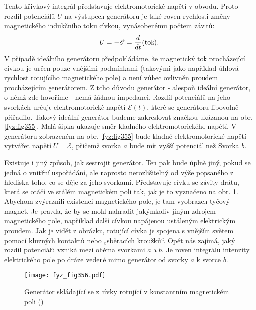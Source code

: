   Tento křivkový integrál představuje elektromotorické napětí v obvodu. Proto rozdíl potenciálů 
  \(U\) na výstupech generátoru je také roven rychlosti změny magnetického indukčního toku cívkou, 
  vynásobenému počtem závitů:
  \begin{equation}\label{fyz:eq479}
   U = -\mathscr{E} = \dfrac{d  }{d t}(\text{tok}).
  \end{equation}
  V případě ideálního generátoru předpokládáme, že magnetický tok procházející cívkou je určen 
  pouze vnějšími podmínkami (takovými jako například úhlová rychlost rotujícího magnetického pole) 
  a není vůbec ovlivněn proudem procházejícím generátorem. Z toho důvodu generátor - alespoň 
  ideální generátor, o němž zde hovoříme - nemá žádnou impedanci. Rozdíl potenciálů na jeho 
  svorkách určuje elektromotorické napětí \(\mathscr{E}(t)\), které se generátoru libovolně 
  přiřadilo. Takový ideální generátor budeme zakreslovat značkou ukázanou na obr. \ref{fyz:fig355}. 
  Malá šipka ukazuje směr kladného elektromotorického napětí. V generátoru zobrazeném na obr. 
  \ref{fyz:fig355} bude kladné elektromotorické napětí vytvářet napětí \(U=\mathscr{E}\), přičemž 
  svorka \(a\) bude mít vyšší potenciál než Svorka \(b\).
  
  Existuje i jiný způsob, jak sestrojit generátor. Ten pak bude úplně jiný, pokud se jedná o 
  vnitřní uspořádání, ale naprosto nerozlišitelný od výše popsaného z hlediska toho, co se děje za 
  jeho svorkami. Představuje cívku se závity drátu, která se otáčí ve stálém magnetickém poli tak, 
  jak je to vyznačeno na obr. \ref{fyz:fig356}. Abychom zvýraznili existenci magnetického pole, je 
  tam vyobrazen tyčový magnet. Je pravda, že by se mohl nahradit jakýmkoliv jiným zdrojem 
  magnetického pole, například další cívkou napájenou ustáleným elektrickým proudem. Jak je vidět z 
  obrázku, rotující cívka je spojena s vnějším světem pomocí kluzných kontaktů nebo „sběracích 
  kroužků“. Opět nás zajímá, jaký rozdíl potenciálů vzniká mezi oběma svorkami \(a\) a \(b\). Je 
  roven integrálu intenzity elektrického pole po dráze vedené mimo generátor od svorky \(a\) k 
  svorce \(b\).

  \begin{figure}[ht!] %
    \centering
    \texttt{[image: fyz\_fig356.pdf]}
    \caption{Generátor skládající se z cívky rotující v konstantním magnetickém poli
             (\cite[s.~397]{Feynman02})}
    \label{fyz:fig356}
  \end{figure}
  
